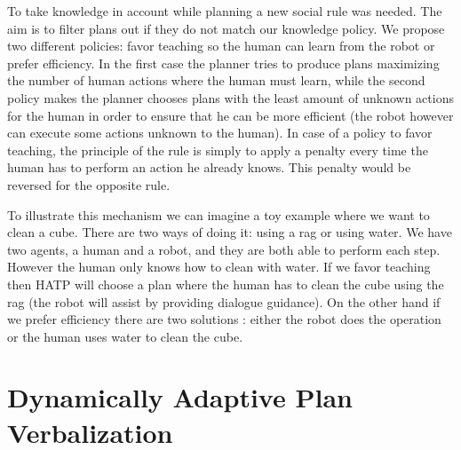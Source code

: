 \documentclass{llncs}
\begin{document}
To take knowledge in account while planning a new social rule was needed. The aim is to filter plans out if they do not match our knowledge policy. We propose two different policies: favor teaching so the human can learn from the robot or prefer efficiency. In the first case the planner tries to produce plans maximizing the number of human actions where the human must learn, while the second policy makes the planner chooses plans with the least amount of unknown actions for the human in order to ensure that he can be more efficient (the robot however can execute some actions unknown to the human).
In case of a policy to favor teaching, the principle of the rule is simply to apply a penalty every time the human has to perform an action he already knows. This penalty would be reversed for the opposite rule.


To illustrate this mechanism we can imagine a toy example where we want to clean a cube. There are two ways of doing it: using a rag or using water. We have two agents, a human and a robot, and they are both able to perform each step. However the human only knows how to clean with water. If we favor teaching then HATP will choose a plan where the human has to clean the cube using the rag (the robot will assist by providing dialogue guidance). On the other hand if we prefer efficiency there are two solutions : either the robot does the operation or the human uses water to clean the cube. 



\section{Dynamically Adaptive Plan Verbalization}
\label{planVerbalization}
\end{document}
